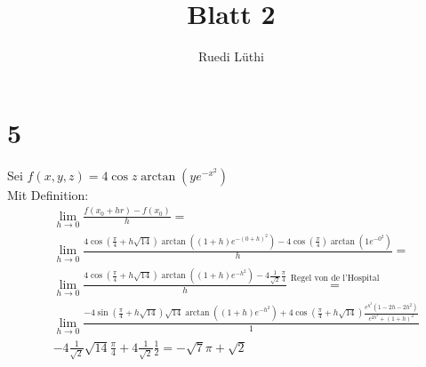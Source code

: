 \documentclass[11pt,a4paper]{article}
\author{Ruedi Lüthi}
\title{Blatt 2}
\newcommand{\1}    	{\mathbbm{1}}
\begin{document}
	\maketitle
	
	\section*{5}
	
	Sei \(f(x,y,z) = 4 \cos z \arctan \left( y e^{-x^2} \right) \)	\\
	
	\noindent
	Mit Definition:
	\begin{align*}
		&\lim_{h \rightarrow 0} \frac{f(x_0 + h r) - f(x_0)}{h} =\\
		&\lim_{h \rightarrow 0} \frac{4 \cos\left( \frac{\pi}{4} + h \sqrt{14} \right) \arctan \left( (1+h) e^{-(0+h)^2} \right) - 4 \cos\left( \frac{\pi}{4} \right) \arctan \left( 1 e^{-0^2} \right) }{h} = \\
		&\lim_{h \rightarrow 0}
		\frac{4 \cos\left( \frac{\pi}{4} + h \sqrt{14} \right)
		\arctan \left( (1+h) e^{-h^2}\right) - 4 \frac{1}{\sqrt{2}} \frac{\pi}{4} }{h} \stackrel{\textrm{Regel von de l'Hospital}}{=} \\
		&\lim_{h \rightarrow 0}
		\frac{
			-4\sin\left( \frac{\pi}{4} + h \sqrt{14} \right) \sqrt{14}  \arctan\left( (1+h)e^{-h^2} \right)
			+4\cos\left( \frac{\pi}{4} + h \sqrt{14} \right) \frac{e^{h^2}(1-2h-2h^2)}{e^{2h^2}+(1+h)^2}
		}{1} \\
		&-4 \frac{1}{\sqrt{2}}\sqrt{14}\frac{\pi}{4}
		+ 4 \frac{1}{\sqrt{2}}\frac{1}{2} = -\sqrt{7}\pi + \sqrt{2}
	\end{align*} \\
	
\end{document}
